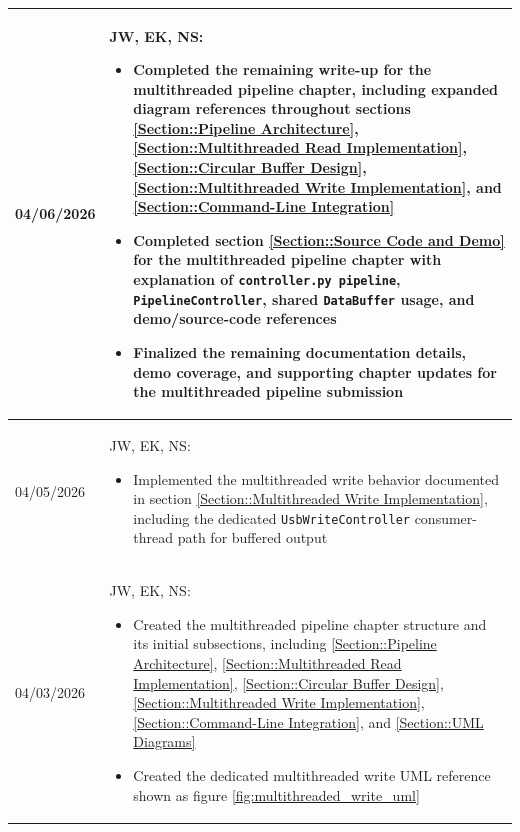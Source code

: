 \begin{longtable}{|l||p{13.5cm}|}
04/06/2026 & 
JW, EK, NS:
\begin{itemize}[topsep=0pt,itemsep=0pt,parsep=0pt,partopsep=0pt,leftmargin=12pt]
\item Completed the remaining write-up for the multithreaded pipeline chapter, including expanded diagram references throughout sections \ref{Section::Pipeline Architecture}, \ref{Section::Multithreaded Read Implementation}, \ref{Section::Circular Buffer Design}, \ref{Section::Multithreaded Write Implementation}, and \ref{Section::Command-Line Integration}
\item Completed section \ref{Section::Source Code and Demo} for the multithreaded pipeline chapter with explanation of \texttt{controller.py pipeline}, \texttt{PipelineController}, shared \texttt{DataBuffer} usage, and demo/source-code references
\item Finalized the remaining documentation details, demo coverage, and supporting chapter updates for the multithreaded pipeline submission
\end{itemize}
\\ \hline

04/05/2026 & 
JW, EK, NS:
\begin{itemize}[topsep=0pt,itemsep=0pt,parsep=0pt,partopsep=0pt,leftmargin=12pt]
\item Implemented the multithreaded write behavior documented in section \ref{Section::Multithreaded Write Implementation}, including the dedicated \texttt{UsbWriteController} consumer-thread path for buffered output
\end{itemize}
\\ \hline

04/03/2026 & 
JW, EK, NS:
\begin{itemize}[topsep=0pt,itemsep=0pt,parsep=0pt,partopsep=0pt,leftmargin=12pt]
\item Created the multithreaded pipeline chapter structure and its initial subsections, including \ref{Section::Pipeline Architecture}, \ref{Section::Multithreaded Read Implementation}, \ref{Section::Circular Buffer Design}, \ref{Section::Multithreaded Write Implementation}, \ref{Section::Command-Line Integration}, and \ref{Section::UML Diagrams}
\item Created the dedicated multithreaded write UML reference shown as figure \ref{fig:multithreaded_write_uml}
\end{itemize}
\\ \hline


\end{longtable}
